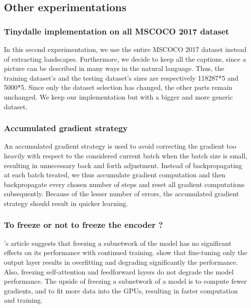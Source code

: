 \documentclass{article}
\begin{document}
\subsection{Other experimentations}
\subsubsection{Tinydalle implementation on all MSCOCO 2017 dataset}

In this second experimentation, we use the entire MSCOCO 2017 dataset instead of extracting landscapes. Furthermore, we decide to keep all the captions, since a picture can be described in many ways in the natural language. Thus, the training dataset's and the testing dataset's sizes are respectively 118287*5 and 5000*5.
Since only the dataset selection has changed, the other parts remain unchanged. We keep our implementation but with a bigger and more generic dataset.

\subsubsection{Accumulated gradient strategy}

An accumulated gradient strategy is used to avoid correcting the gradient too heavily with respect to the considered current batch when the batch size is small, resulting in unnecessary back and forth adjustment. Instead of backpropagating at each batch treated, we thus accumulate gradient computation and then backpropagate every chosen number of steps and reset all gradient computations subsequently. Because of the lesser number of errors, the accumulated gradient strategy should result in quicker learning.


\subsubsection{To freeze or not to freeze the encoder ?}

\cite{Thompson_2018}'s article suggests that freezing a subnetwork of the model has no significant effects on its performance with continued training. \cite{https://doi.org/10.48550/arxiv.2103.05247} show that fine-tuning only the output layer results in overfitting and degrading significantly the performance. Also, freezing self-attention and feedforward layers do not degrade the model performance.
The upside of freezing a subnetwork of a model is to compute fewer gradients, and to fit more data into the GPUs, resulting in faster computation and training.
\end{document}
